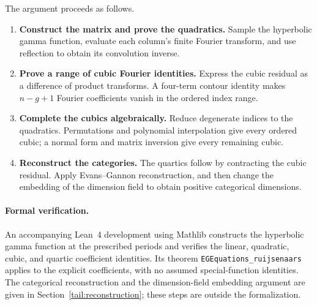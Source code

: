 \documentclass[11pt]{article}
\numberwithin{equation}{section}
\theoremstyle{definition}
\theoremstyle{remark}
\begin{document}
The argument proceeds as follows.
\begin{enumerate}
\setlength{\itemsep}{2pt}
\item \textbf{Construct the matrix and prove the quadratics.}
Sample the hyperbolic gamma function, evaluate each column's finite
Fourier transform, and use reflection to obtain its convolution inverse.
\item \textbf{Prove a range of cubic Fourier identities.}
Express the cubic residual as a difference of product transforms.
A four-term contour identity makes $n-g+1$ Fourier coefficients vanish
in the ordered index range.
\item \textbf{Complete the cubics algebraically.}
Reduce degenerate indices to the quadratics. Permutations and polynomial
interpolation give every ordered cubic; a normal form and matrix
inversion give every remaining cubic.
\item \textbf{Reconstruct the categories.}
The quartics follow by contracting the cubic residual. Apply
Evans--Gannon reconstruction, and then change the embedding of the
dimension field to obtain positive categorical dimensions.
\end{enumerate}

\paragraph{Formal verification.}
An accompanying Lean~4 development using Mathlib constructs the
hyperbolic gamma function at the prescribed periods and verifies
the linear, quadratic, cubic, and quartic coefficient identities.
Its theorem \texttt{EGEquations\_ruijsenaars} applies to the explicit
coefficients, with no assumed special-function identities.
The categorical reconstruction and the dimension-field embedding
argument are given in Section~\ref{tail:reconstruction}; these steps
are outside the formalization.
\end{document}
